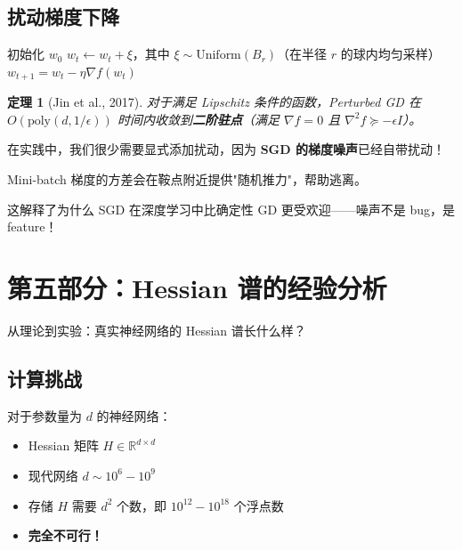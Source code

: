 \documentclass[12pt, a4paper]{ctexart}
\newtheorem{theorem}{定理}[section]
\begin{document}
\subsection{扰动梯度下降}

\begin{algorithm}
\caption{Perturbed Gradient Descent}
\begin{algorithmic}[1]
\STATE 初始化 $w_0$
        \STATE $w_t \leftarrow w_t + \xi$，其中 $\xi \sim \text{Uniform}(B_r)$（在半径 $r$ 的球内均匀采样）
    \ENDIF
    \STATE $w_{t+1} = w_t - \eta \nabla f(w_t)$
\ENDFOR
\end{algorithmic}
\end{algorithm}

\begin{theorem}[Jin et al., 2017]
对于满足 Lipschitz 条件的函数，Perturbed GD 在 $O(\text{poly}(d, 1/\epsilon))$ 时间内收敛到\textbf{二阶驻点}（满足 $\nabla f = 0$ 且 $\nabla^2 f \succeq -\epsilon I$）。
\end{theorem}

\begin{insight}
在实践中，我们很少需要显式添加扰动，因为 \textbf{SGD 的梯度噪声}已经自带扰动！

Mini-batch 梯度的方差会在鞍点附近提供"随机推力"，帮助逃离。

这解释了为什么 SGD 在深度学习中比确定性 GD 更受欢迎——噪声不是 bug，是 feature！
\end{insight}


\section{第五部分：Hessian 谱的经验分析}

从理论到实验：真实神经网络的 Hessian 谱长什么样？

\subsection{计算挑战}

\begin{mathbox}
对于参数量为 $d$ 的神经网络：
\begin{itemize}
    \item Hessian 矩阵 $H \in \mathbb{R}^{d \times d}$
    \item 现代网络 $d \sim 10^6 - 10^9$
    \item 存储 $H$ 需要 $d^2$ 个数，即 $10^{12} - 10^{18}$ 个浮点数
    \item \textbf{完全不可行！}
\end{itemize}
\end{mathbox}
\end{document}
